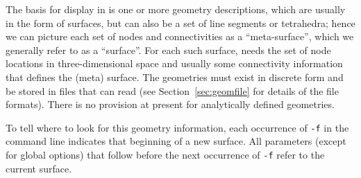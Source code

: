 The basis for display in \map{} is one or more geometry descriptions,
which are usually in the form of surfaces, but can also be a set of line
segments or tetrahedra; hence we can picture each set of nodes and
connectivities as a ``meta-surface'', which we generally refer to as a
``surface''.  For each such surface, \map{} needs the set of node locations
in three-dimensional space and usually some connectivity information that
defines the (meta) surface.  The geometries must exist in discrete form and
be stored in files that \map{} can read (see Section~\ref{sec:geomfile} for
details of the file formats).  There is no provision at present for
analytically defined geometries.

To tell \map{} where to look for this geometry information, 
each occurrence of \texttt{-f} in the command line indicates that 
beginning of a new surface.  All parameters (except for global options)
that follow before the 
next occurrence of \texttt{-f} refer to the current surface.
%
